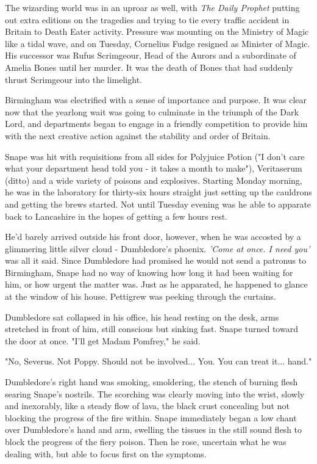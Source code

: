 \documentclass[a4paper,11pt]{article}
\begin{document}
The wizarding world was in an uproar as well, with \emph{The Daily Prophet} putting out extra editions on the tragedies and trying to tie every traffic accident in Britain to Death Eater activity. Pressure was mounting on the Ministry of Magic like a tidal wave, and on Tuesday, Cornelius Fudge resigned as Minister of Magic. His successor was Rufus Scrimgeour, Head of the Aurors and a subordinate of Amelia Bones until her murder. It was the death of Bones that had suddenly thrust Scrimgeour into the limelight.

Birmingham was electrified with a sense of importance and purpose. It was clear now that the yearlong wait was going to culminate in the triumph of the Dark Lord, and departments began to engage in a friendly competition to provide him with the next creative action against the stability and order of Britain.

Snape was hit with requisitions from all sides for Polyjuice Potion ("I don't care what your department head told you - it takes a month to make"), Veritaserum (ditto) and a wide variety of poisons and explosives. Starting Monday morning, he was in the laboratory for thirty-six hours straight just setting up the cauldrons and getting the brews started. Not until Tuesday evening was he able to apparate back to Lancashire in the hopes of getting a few hours rest.

He'd barely arrived outside his front door, however, when he was accosted by a glimmering little silver cloud - Dumbledore's phoenix. \emph{'Come at once. I need you' }was all it said. Since Dumbledore had promised he would not send a patronus to Birmingham, Snape had no way of knowing how long it had been waiting for him, or how urgent the matter was. Just as he apparated, he happened to glance at the window of his house. Pettigrew was peeking through the curtains.

Dumbledore sat collapsed in his office, his head resting on the desk, arms stretched in front of him, still conscious but sinking fast. Snape turned toward the door at once. "I'll get Madam Pomfrey," he said.

"No, Severus. Not Poppy. Should not be involved... You. You can treat it... hand."

Dumbledore's right hand was smoking, smoldering, the stench of burning flesh searing Snape's nostrils. The scorching was clearly moving into the wrist, slowly and inexorably, like a steady flow of lava, the black crust concealing but not blocking the progress of the fire within. Snape immediately began a low chant over Dumbledore's hand and arm, swelling the tissues in the still sound flesh to block the progress of the fiery poison. Then he rose, uncertain what he was dealing with, but able to focus first on the symptoms.
\end{document}
